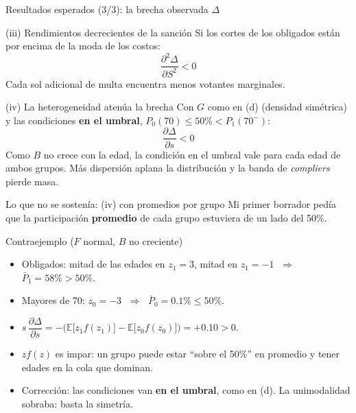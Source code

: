 \documentclass[aspectratio=169,11pt,xcolor=table]{beamer}
\newcommand{\itemgap}{1.3em}
\newcommand{\hl}[1]{\textcolor{upaccent}{\textbf{#1}}}
\begin{document}
\begin{frame}{Resultados esperados (3/3): la brecha observada $\Delta$}
  \begin{block}{(iii) Rendimientos decrecientes de la sanción}
    \small Si los cortes de los obligados están por encima de la moda de los costos:
    \[ \frac{\partial^2\Delta}{\partial S^2}<0 \]
    \footnotesize Cada sol adicional de multa encuentra menos votantes marginales.
  \end{block}
  \vspace{0.15cm}
  \begin{block}{(iv) La heterogeneidad atenúa la brecha}
    \small Con $G$ como en (d) (densidad simétrica) y las condiciones \textbf{en el umbral}, $P_0(70)\le 50\%<P_1(70^-)$:
    \[ \frac{\partial\Delta}{\partial s}<0 \]
    \footnotesize Como $B$ no crece con la edad, la condición en el umbral vale para cada edad de ambos grupos. Más dispersión aplana la distribución y la banda de \textit{compliers} pierde masa.
  \end{block}
\end{frame}

\begin{frame}{Lo que no se sostenía: (iv) con promedios por grupo}
  \small Mi primer borrador pedía que la participación \textbf{promedio} de cada grupo estuviera de un lado del 50\%.
  \vspace{0.1cm}
  \begin{block}{Contraejemplo ($F$ normal, $B$ no creciente)}
    \small
    \renewcommand{\itemgap}{0.3em}
    \begin{itemize}
      \item Obligados: mitad de las edades en $z_1=3$, mitad en $z_1=-1$ $\;\Rightarrow\;$ $\bar P_1=58\%>50\%$.
      \item Mayores de 70: $z_0=-3$ $\;\Rightarrow\;$ $\bar P_0=0.1\%\le 50\%$.
      \item $s\,\dfrac{\partial\Delta}{\partial s}=-\Big(\mathbb E\big[z_1 f(z_1)\big]-\mathbb E\big[z_0 f(z_0)\big]\Big)=+0.10>0$.
    \end{itemize}
  \end{block}
  \vspace{0.1cm}
  \renewcommand{\itemgap}{0.5em}
  \begin{itemize}
    \item $z f(z)$ es impar: un grupo puede estar ``sobre el 50\%'' en promedio y tener edades en la cola que dominan.
    \item Corrección: las condiciones van \hl{en el umbral}, como en (d). La unimodalidad sobraba: basta la simetría.
  \end{itemize}
\end{frame}
\end{document}
